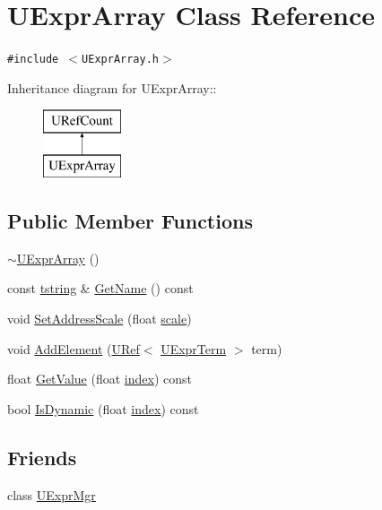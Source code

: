 \hypertarget{class_u_expr_array}{
\section{UExprArray Class Reference}
\label{class_u_expr_array}
}
{\tt \#include $<$UExprArray.h$>$}

Inheritance diagram for UExprArray::\begin{figure}[H]
\begin{center}
\leavevmode
\includegraphics[height=2cm]{class_u_expr_array}
\end{center}
\end{figure}
\subsection*{Public Member Functions}
\begin{CompactItemize}
\item 
\hyperlink{class_u_expr_array_d00ea896c50c4aca1785fabdd56b1604}{$\sim$UExprArray} ()
\item 
const \hyperlink{common__afx_8h_816fa58fd77499b0edb2c69ebe803d5c}{tstring} \& \hyperlink{class_u_expr_array_c20f0a1422d0813f46d93b6920f2b026}{GetName} () const 
\item 
void \hyperlink{class_u_expr_array_5146bc80ce998498094442d2323e66aa}{SetAddressScale} (float \hyperlink{glext__bak_8h_281421b881aa7a1266842b73a3bc7655}{scale})
\item 
void \hyperlink{class_u_expr_array_fe206a8ac283eb69e123ba7cec9f52da}{AddElement} (\hyperlink{class_u_ref}{URef}$<$ \hyperlink{class_u_expr_term}{UExprTerm} $>$ term)
\item 
float \hyperlink{class_u_expr_array_6d9d46d67eb7dcb043032e944e67c5e2}{GetValue} (float \hyperlink{glext__bak_8h_57f14e05b1900f16a2da82ade47d0c6d}{index}) const 
\item 
bool \hyperlink{class_u_expr_array_6c44f1bdc753091ee7a33f653723a78d}{IsDynamic} (float \hyperlink{glext__bak_8h_57f14e05b1900f16a2da82ade47d0c6d}{index}) const 
\end{CompactItemize}
\subsection*{Friends}
\begin{CompactItemize}
\item 
class \hyperlink{class_u_expr_array_aba1a84b84f2ff7cab4b76539215bd34}{UExprMgr}
\end{CompactItemize}


